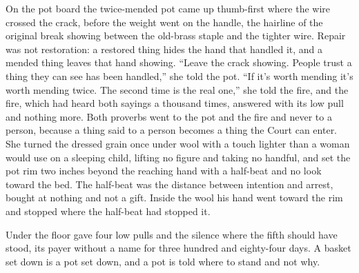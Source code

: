 On the pot board the twice-mended pot came up thumb-first where the wire crossed the crack, before the weight went on the handle, the hairline of the original break showing between the old-brass staple and the tighter wire. Repair was not restoration: a restored thing hides the hand that handled it, and a mended thing leaves that hand showing. “Leave the crack showing. People trust a thing they can see has been handled,” she told the pot. “If it's worth mending it's worth mending twice. The second time is the real one,” she told the fire, and the fire, which had heard both sayings a thousand times, answered with its low pull and nothing more. Both proverbs went to the pot and the fire and never to a person, because a thing said to a person becomes a thing the Court can enter. She turned the dressed grain once under wool with a touch lighter than a woman would use on a sleeping child, lifting no figure and taking no handful, and set the pot rim two inches beyond the reaching hand with a half-beat and no look toward the bed. The half-beat was the distance between intention and arrest, bought at nothing and not a gift. Inside the wool his hand went toward the rim and stopped where the half-beat had stopped it.

Under the floor  gave four low pulls and the silence where the fifth should have stood, its payer without a name for three hundred and eighty-four days. A basket set down is a pot set down, and a pot is told where to stand and not why.

\scenebreak

